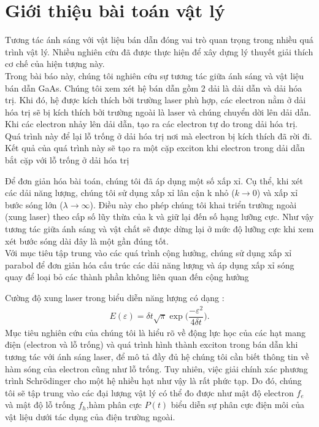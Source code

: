 \documentclass[%
 reprint,
 amsmath,amssymb,
 aps,
]{revtex4-2}
\begin{document}
\section{\label{sec:level1}Giới thiệu bài toán vật lý}
Tương tác ánh sáng với vật liệu bán dẫn đóng vai trò quan trọng trong nhiều quá trình vật lý. Nhiều nghiên cứu đã được thực hiện để xây dựng lý thuyết giải thích cơ chế của hiện tượng này.\\
Trong bài báo này, chúng tôi nghiên cứu sự tương tác giữa ánh sáng và vật liệu bán dẫn GaAs. Chúng tôi xem xét hệ bán dẫn gồm 2 dải là dải dẫn và dải hóa trị. Khi đó, hệ được kích thích bởi trường laser phù hợp, các electron nằm ở dải hóa trị sẽ bị kích thích bởi trường ngoài là laser và chúng chuyển dời lên dải dẫn.\\
Khi các electron nhảy lên dải dẫn, tạo ra các electron tự do trong dải hóa trị. Quá trình này để lại lỗ trống ở dải hóa trị nơi mà electron bị kích thích đã rời đi. Kết quả của quá trình này sẽ tạo ra một cặp exciton khi electron trong dải dẫn bắt cặp với lỗ trống ở dải hóa trị

Để đơn giản hóa bài toán, chúng tôi đã áp dụng một số xấp xỉ. Cụ thể, khi xét các dải năng lượng, chúng tôi sử dụng xấp xỉ lân cận k nhỏ ($k\rightarrow 0$) và xấp xỉ bước sóng lớn ($\lambda\rightarrow\infty$). Điều này cho phép chúng tôi khai triển trường ngoài (xung laser) theo cấp số lũy thừa của k và giữ lại đến số hạng lưỡng cực. Như vậy tương tác giữa ánh sáng và vật chất sẽ được dừng lại ở mức độ lưỡng cực khi xem xét bước sóng dài đây là một gần đúng tốt.\\
Với mục tiêu tập trung vào các quá trình cộng hưởng, chúng sử dụng xấp xỉ parabol để đơn giản hóa cấu trúc các dải năng lượng và áp dụng xấp xỉ sóng quay để loại bỏ các thành phần không liên quan đến cộng hưởng 

Cường độ xung laser trong biểu diễn năng lượng có dạng :
\begin{align}
	E(\varepsilon)=\delta t\sqrt{\pi}\exp{\bigg(\dfrac{-\varepsilon^2}{4\delta t}\bigg)}.
\end{align}
Mục tiêu nghiên cứu của chúng tôi là hiểu rõ về động lực học của các hạt mang điện (electron và lỗ trống) và quá trình hình thành exciton trong bán dẫn khi tương tác với ánh sáng laser, để mô tả đầy đủ hệ chúng tôi cần biết thông tin về hàm sóng của electron cũng như lỗ trống. Tuy nhiên, việc giải chính xác phương trình Schrödinger cho một hệ nhiều hạt như vậy là rất phức tạp. Do đó, chúng tôi sẽ tập trung vào các đại lượng vật lý có thể đo được như mật độ electron $f_e$ và mật độ lỗ trống $f_h$,hàm phân cực $P(t)$  biểu diễn sự phân cực điện môi của vật liệu dưới tác dụng của điện trường ngoài.
\end{document}
